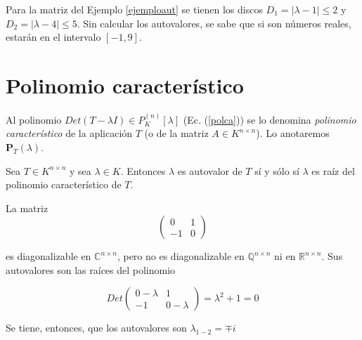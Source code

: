 Para la matriz del Ejemplo \ref{ejemploaut} se  tienen los discos  $D_1=|\lambda-1|  \leq 2$ y $D_2=|\lambda-4|  \leq 5$.  Sin calcular los autovalores, se sabe que si son números reales, estarán  en el intervalo $[-1,9]$.


\section{Polinomio característico}
\label{polcar}

Al polinomio $Det(T-\lambda I) \in P_K^{(n)}\left[\lambda\right]$  (Ec. (\ref{polca})) se lo denomina \textit{polinomio característico} de la aplicación $T$  (o de la matriz $A \in K^{n \times n}$). Lo anotaremos  $\mathbf{P}_T( \lambda) $.

\bigskip

\begin{theorem}
\label{proppolauto}

Sea $T\in K^{n \times n}$ y sea $\lambda \in K$. Entonces $\lambda$ es autovalor de $T$ sí y sólo sí $\lambda$ es raíz del polinomio característico de $T$.


\end{theorem}

\bigskip

\begin{example}
La matriz 
$$\left(\begin{array}{cc}  0 & 1  \\ -1 &  0
\end{array}
 \right)$$

 \bigskip
\noindent 
es diagonalizable en $\mathbb{C}^{n \times n}$, pero no es diagonalizable en $\mathbb{Q}^{n \times n}$ ni en $\mathbb{R}^{n \times n}$. Sus autovalores son las raíces del polinomio


$$Det\left(\begin{array}{cc}  0-\lambda  & 1  \\ -1 &  0-\lambda
\end{array}
 \right)= \lambda^2+1=0 $$

\bigskip

Se tiene, entonces, que los autovalores son $\lambda_{1-2}= \mp i$
\end{example}






\bigskip


